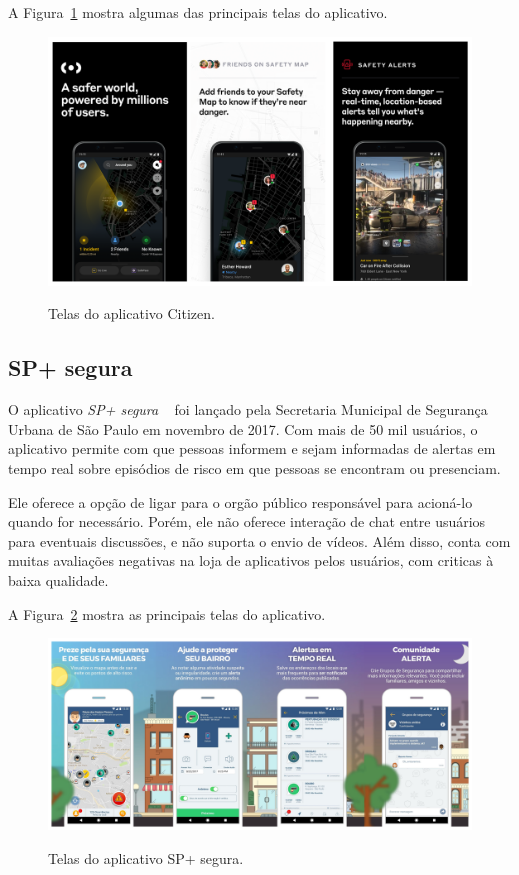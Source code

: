 A Figura~\ref{f.citizen} mostra algumas das principais telas do aplicativo.

\begin{figure}[h]
	\caption{\small Telas do aplicativo Citizen.}
	\centering
	\includegraphics[width=\textwidth]{./images/citizen.png}
	\label{f.citizen}
\end{figure}

\subsection{SP+ segura}

O aplicativo \emph{SP+ segura} ~\cite{sp-mais-segura} foi lançado pela Secretaria Municipal de Segurança Urbana de São Paulo em novembro de 2017. Com mais de 50 mil usuários, o aplicativo permite com que pessoas informem e sejam informadas de alertas em tempo real sobre episódios de risco em que pessoas se encontram ou presenciam. 

Ele oferece a opção de ligar para o orgão público responsável para acioná-lo quando for necessário. Porém, ele não oferece interação de chat entre usuários para eventuais discussões, e não suporta o envio de vídeos. Além disso, conta com muitas avaliações negativas na loja de aplicativos pelos usuários, com criticas à baixa qualidade.

A Figura~\ref{f.sp-mais-segura} mostra as principais telas do aplicativo.

\begin{figure}[h]
	\caption{\small Telas do aplicativo SP+ segura.}
	\centering
	\includegraphics[width=\textwidth]{./images/sp-mais-segura.png}
	\label{f.sp-mais-segura}
\end{figure}

